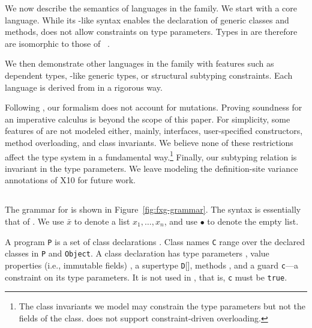 \newcommand\comma{,~}
\newcommand\tj[2]{{#1} \vdash_{\cal T}{#2}}
\newcommand\cj[2]{{#1} \vdash_{\cal C}{#2}}
\newcommand\wj[2]{{#1} \vdash_{\cal W}{#2}}
\newcommand\cdecl{{\tt class}~{\tt C}[\tbar{X}]\{{\tt c}\}(\tbar{f}\ty\tbar{F})~{\tt extends}~{\tt D}[\tbar{E}]~\{~\tbar{M}~\}}
\newcommand\msign[5]{{\tt m}[\tbar{#1}](\tbar{#2}\ty\tbar{#3})\{{\tt #4}\}\ty{\tt #5}}
\newcommand\minst[6]{\msign{#1}{#2}{#3}{#4}{#5}={\tt #6}}
\newcommand\mdecl[6]{{\tt def}~\minst{#1}{#2}{#3}{#4}{#5}{#6}}
\newcommand{\vdashQ}{\vdash_{\cal Q}}
\newcommand{\vdashS}{\vdash_{\cal S}}
\newcommand{\Dom}{{\sf Dom}}
\newcommand{\Img}{{\sf Img}}

We now describe the semantics of languages in the  family. We start with a core \FXGL{\cdot} language. While its \FGJ-like syntax enables the declaration of generic classes and methods, \FXGL{\cdot} does not allow constraints on type parameters. Types in \FXGL{\cdot} are therefore are isomorphic to those of \CFJ~\cite{constrained-types}.

We then demonstrate other languages in the family with features such as dependent types, \FGJ-like generic types, or structural subtyping constraints. Each language is derived from \FXGL{\cdot} in a rigorous way. %

Following \FJ, our formalism does not account for mutations. Proving soundness for an imperative calculus is beyond the scope of this paper.
For simplicity, some features of \Xten are not modeled either, mainly, interfaces, user-specified constructors, method overloading, and class invariants. We believe none of these restrictions affect the type system in a fundamental way.\footnote{The class invariants we model may constrain the type parameters but not the fields of the class. \Xten does not support constraint-driven overloading.} Finally, our subtyping relation is invariant in the type parameters. We leave modeling the definition-site variance annotations of X10 for future work.


\subsection{\FXGL{\cdot}}

The grammar for \FXGL{\cdot} is shown in Figure~\ref{fig:fxg-grammar}. The syntax is essentially that of \FGJ. We use $\bar{x}$ to denote a list $x_1, \dots, x_n$, and use $\bullet$ to denote the empty list.

A program {\tt P} is a set of class declarations . Class names {\tt C} range over the declared classes in {\tt P} and {\tt Object}. A class declaration has type parameters , value properties (i.e., immutable fields) , a supertype {\tt D}[], methods , and a guard {\tt c}---a constraint on its type parameters. It is not used in \FXGL{\cdot}, that is, {\tt c} must be {\tt true}.


